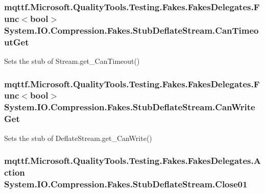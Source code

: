 \hypertarget{class_system_1_1_i_o_1_1_compression_1_1_fakes_1_1_stub_deflate_stream_a02d7a410006c48202267078e3c3d3324}{
\subsubsection[{Can\-Timeout\-Get}]{\setlength{\rightskip}{0pt plus 5cm}mqttf.\-Microsoft.\-Quality\-Tools.\-Testing.\-Fakes.\-Fakes\-Delegates.\-Func$<$bool$>$ System.\-I\-O.\-Compression.\-Fakes.\-Stub\-Deflate\-Stream.\-Can\-Timeout\-Get}}\label{class_system_1_1_i_o_1_1_compression_1_1_fakes_1_1_stub_deflate_stream_a02d7a410006c48202267078e3c3d3324}


Sets the stub of Stream.\-get\-\_\-\-Can\-Timeout()

\hypertarget{class_system_1_1_i_o_1_1_compression_1_1_fakes_1_1_stub_deflate_stream_a870c0f53dee716481e4b3d9099e092d5}{
\subsubsection[{Can\-Write\-Get}]{\setlength{\rightskip}{0pt plus 5cm}mqttf.\-Microsoft.\-Quality\-Tools.\-Testing.\-Fakes.\-Fakes\-Delegates.\-Func$<$bool$>$ System.\-I\-O.\-Compression.\-Fakes.\-Stub\-Deflate\-Stream.\-Can\-Write\-Get}}\label{class_system_1_1_i_o_1_1_compression_1_1_fakes_1_1_stub_deflate_stream_a870c0f53dee716481e4b3d9099e092d5}


Sets the stub of Deflate\-Stream.\-get\-\_\-\-Can\-Write()

\hypertarget{class_system_1_1_i_o_1_1_compression_1_1_fakes_1_1_stub_deflate_stream_a1f5090237c142c371f640921e8f24520}{
\subsubsection[{Close01}]{\setlength{\rightskip}{0pt plus 5cm}mqttf.\-Microsoft.\-Quality\-Tools.\-Testing.\-Fakes.\-Fakes\-Delegates.\-Action System.\-I\-O.\-Compression.\-Fakes.\-Stub\-Deflate\-Stream.\-Close01}}\label{class_system_1_1_i_o_1_1_compression_1_1_fakes_1_1_stub_deflate_stream_a1f5090237c142c371f640921e8f24520}


